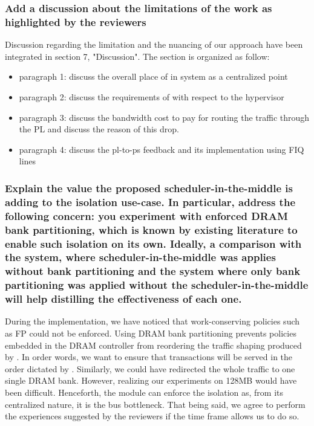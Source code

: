         \subsubsection{Add a discussion about the limitations of the work as highlighted by the reviewers}
            Discussion regarding the limitation and the nuancing of our approach have been integrated in section 7, "Discussion".
            The section is organized as follow:
            \begin{itemize}
                \item paragraph 1: discuss the overall place of \schim in system as a centralized point
                \item paragraph 2: discuss the requirements of \schim with respect to the hypervisor
                \item paragraph 3: discuss the bandwidth cost to pay for routing the traffic through the PL and discuss the reason of this drop.
                \item paragraph 4: discuss the pl-to-ps feedback and its implementation using FIQ lines
            \end{itemize}

        \subsubsection{Explain the value the proposed scheduler-in-the-middle is adding to the isolation use-case. In particular, address the following concern: you experiment with enforced DRAM bank partitioning, which is known by existing literature to enable such isolation on its own. Ideally, a comparison with the system, where scheduler-in-the-middle was applies without bank partitioning and the system where only bank partitioning was applied without the scheduler-in-the-middle will help distilling the effectiveness of each one.}
        During the implementation, we have noticed that work-conserving policies such as FP could not be enforced.
        Using DRAM bank partitioning prevents policies embedded in the DRAM controller from reordering the traffic shaping produced by \schim.
        In order words, we want to ensure that transactions will be served in the order dictated by \schim.
        Similarly, we could have redirected the whole traffic to one single DRAM bank. However, realizing our experiments on 128MB would have been difficult.
        Henceforth, the \schim module can enforce the isolation as, from its centralized nature, it is the bus bottleneck.
        That being said, we agree to perform the experiences suggested by the reviewers if the time frame allows us to do so.

